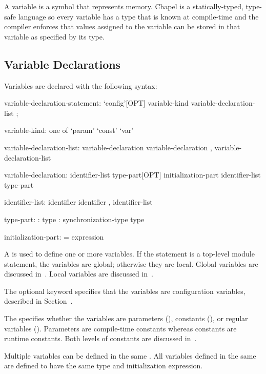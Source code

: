 \label{Variables}

A variable is a symbol that represents memory.  Chapel is a
statically-typed, type-safe language so every variable has a type that
is known at compile-time and the compiler enforces that values
assigned to the variable can be stored in that variable as specified
by its type.

\subsection{Variable Declarations}
\label{Variable_Declarations}

Variables are declared with the following syntax:
\begin{syntax}
variable-declaration-statement:
  `config'[OPT] variable-kind variable-declaration-list ;

variable-kind: one of
  `param' `const' `var'

variable-declaration-list:
  variable-declaration
  variable-declaration , variable-declaration-list

variable-declaration:
  identifier-list type-part[OPT] initialization-part
  identifier-list type-part

identifier-list:
  identifier
  identifier , identifier-list

type-part:
  : type
  : synchronization-type type

initialization-part:
  = expression
\end{syntax}
A  is used to define one or more
variables.  If the statement is a top-level module statement, the
variables are global; otherwise they are local.  Global variables are
discussed in~.  Local variables are discussed
in~.

The optional keyword  specifies that the variables are
configuration variables, described in
Section~.

The  specifies whether the variables are
parameters (), constants (), or regular
variables ().  Parameters are compile-time constants whereas
constants are runtime constants.  Both levels of constants are
discussed in~.

Multiple variables can be defined in the same .
All variables defined in the same  are
defined to have the same type and initialization expression.

